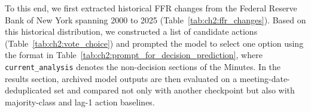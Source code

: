 To this end, we first extracted historical FFR changes from the Federal Reserve Bank of New York spanning 2000 to 2025 (Table~\ref{tab:ch2:ffr_changes}). Based on this historical distribution, we constructed a list of candidate actions (Table~\ref{tab:ch2:vote_choice}) and prompted the model to select one option using the format in Table~\ref{tab:ch2:prompt_for_decision_prediction}, where \texttt{current\_analysis} denotes the non-decision sections of the Minutes. In the results section, archived model outputs are then evaluated on a meeting-date-deduplicated set and compared not only with another checkpoint but also with majority-class and lag-1 action baselines.


